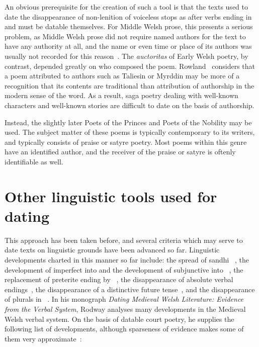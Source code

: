 An obvious prerequisite for the creation of such a tool is that the texts used to date the disappearance of non-lenition of voiceless stops as after verbs ending in  and  must be datable themselves. For Middle Welsh prose, this presents a serious problem, as Middle Welsh prose did not require named authors for the text to have any authority at all, and the name or even time or place of its authors was usually not recorded for this reason~\parencite[51]{rodway_date_2005}. The \emph{auctoritas} of Early Welsh poetry, by contrast, depended greatly on who composed the poem. Rowland~\parencite*[44]{rowland_y_2003} considers that a poem attributed to authors such as Taliesin or Myrddin may be more of a recognition that its contents are traditional than attribution of authorship in the modern sense of the word. As a result, saga poetry dealing with well-known characters and well-known stories are difficult to date on the basis of authorship.

Instead, the slightly later Poets of the Princes and Poets of the Nobility may be used. The subject matter of these poems is typically contemporary to its writers, and typically consists of praise or satyre poetry. Most poems within this genre have an identified author, and the receiver of the praise or satyre is oftenly identifiable as well. 
\section{Other linguistic tools used for dating}
This approach has been taken before, and several criteria which may serve to date texts on linguistic grounds have been advanced so far. Linguistic developments charted in this manner so far include: the spread of sandhi ~\parencite{sims-williams_spread_2010}, the development of imperfect  into  and the development of subjunctive  into ~\parencite{rodway_two_2003}, the replacement of preterite ending  by ~\parencite{rodway_datable_1998}, the disappearance of absolute verbal endings~\parencite{rodway_absolute_2002}, the disappearance of a distinctive future tense~\parencite{isaac_old-_2004}, and the disappearance of plurals in ~\parencite{nurmio_middle_2014}. In his monograph \textit{Dating Medieval Welsh Literature: Evidence from the Verbal System}, Rodway analyses many developments in the Medieval Welsh verbal system. On the basis of datable court poetry, he supplies the following list of developments, although sparseness of evidence makes some of them very approximate~\parencite*[166]{rodway_dating_2013}:

